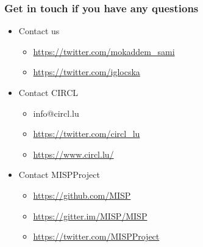 \begin{frame}
  \frametitle{Get in touch if you have any questions}
  \begin{itemize}
    \item Contact us
    \begin{itemize}
      \item \url{https://twitter.com/mokaddem_sami}
      \item \url{https://twitter.com/iglocska}
    \end{itemize}
    \item Contact CIRCL
    \begin{itemize}
      \item info@circl.lu
      \item \url{https://twitter.com/circl_lu}
      \item \url{https://www.circl.lu/}
    \end{itemize}
    \item Contact MISPProject 
    \begin{itemize}
      \item \url{https://github.com/MISP}
      \item \url{https://gitter.im/MISP/MISP}
      \item \url{https://twitter.com/MISPProject}
    \end{itemize}
  \end{itemize}
\end{frame}
